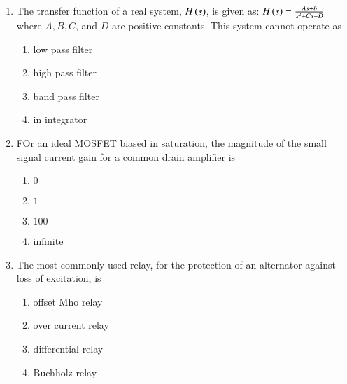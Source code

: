 \documentclass[journal]{IEEEtran}
\begin{document}
\begin{enumerate}
{\begin{enumerate}
{\begin{figure}[!ht]
\label{fig:my_label}
\end{figure}
}
\end{enumerate}
}
\item{
The transfer function of a real system, $H\left(s\right)$, is given as: $H\left(s\right)=\frac{As+b}{s^2+Cs+D}$ where $A,B,C$, and $D$ are positive constants. This system cannot operate as 
\begin{multicols}{4}
\begin{enumerate}
\item low pass filter
\item high pass filter
\item band pass filter
\item in integrator
\end{enumerate}
\end{multicols}
}
\item{
FOr an ideal MOSFET biased in saturation, the magnitude of the small signal current gain for a common drain amplifier is
\begin{multicols}{4}
\begin{enumerate}
\item $0$
\item $1$
\item $100$
\item infinite
\end{enumerate}
\end{multicols}
}
\item{
The most commonly used relay, for the protection of an alternator against loss of excitation, is
\begin{multicols}{2}
    \begin{enumerate}
        \item offset Mho relay
        \item over current relay
        \item differential relay
        \item Buchholz relay
    \end{enumerate}
\end{multicols}
}
\end{enumerate}
\end{document}
